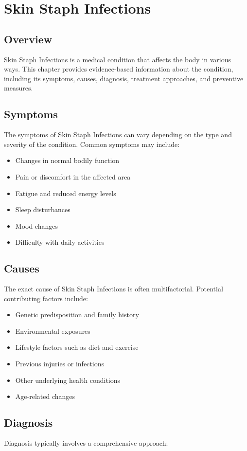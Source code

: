 \chapter{Skin Staph Infections}

\section*{Overview}
Skin Staph Infections is a medical condition that affects the body in various ways. This chapter provides evidence-based information about the condition, including its symptoms, causes, diagnosis, treatment approaches, and preventive measures.

\section*{Symptoms}
The symptoms of Skin Staph Infections can vary depending on the type and severity of the condition. Common symptoms may include:

\begin{itemize}
\item Changes in normal bodily function
\item Pain or discomfort in the affected area
\item Fatigue and reduced energy levels
\item Sleep disturbances
\item Mood changes
\item Difficulty with daily activities
\end{itemize}

\section*{Causes}
The exact cause of Skin Staph Infections is often multifactorial. Potential contributing factors include:

\begin{itemize}
\item Genetic predisposition and family history
\item Environmental exposures
\item Lifestyle factors such as diet and exercise
\item Previous injuries or infections
\item Other underlying health conditions
\item Age-related changes
\end{itemize}

\section*{Diagnosis}
Diagnosis typically involves a comprehensive approach:

